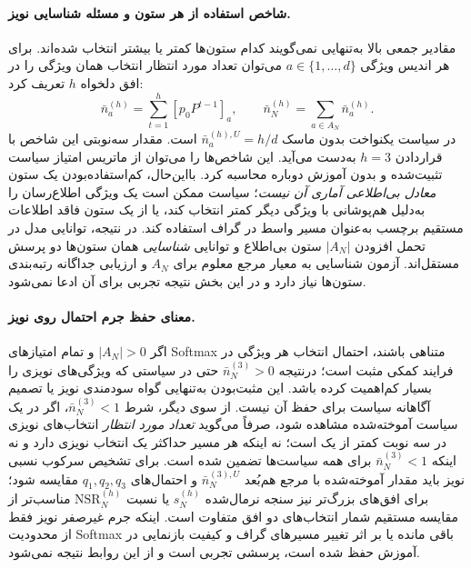 \paragraph{شاخص استفاده از هر ستون و مسئله شناسایی نویز.}
مقادیر جمعی بالا به‌تنهایی نمی‌گویند
کدام ستون‌ها کمتر یا بیشتر انتخاب شده‌اند.
برای هر اندیس ویژگی $a\in\{1,\ldots,d\}$
می‌توان تعداد مورد انتظار انتخاب همان ویژگی
را در افق دلخواه $h$ تعریف کرد:
\begin{equation}\label{eq:ch3-noise-per-feature-selection}
\boxed{
\bar n_a^{(h)}
=\sum_{t=1}^{h}[p_0P^{t-1}]_a,\qquad
\bar n_N^{(h)}=\sum_{a\in A_N}\bar n_a^{(h)}.
}
\end{equation}
در سیاست یکنواخت بدون ماسک
$\bar n_a^{(h),U}=h/d$ است.
مقدار سه‌نوبتی این شاخص با قراردادن $h=3$
به‌دست می‌آید.
این شاخص‌ها را می‌توان از ماتریس امتیاز
سیاست تثبیت‌شده و بدون آموزش دوباره محاسبه کرد.
بااین‌حال، کم‌استفاده‌بودن یک ستون
\emph{معادل بی‌اطلاعی آماری آن نیست}؛
سیاست ممکن است یک ویژگی اطلاع‌رسان را
به‌دلیل هم‌پوشانی با ویژگی دیگر کمتر انتخاب کند،
یا از یک ستون فاقد اطلاعات مستقیم برچسب
به‌عنوان مسیر واسط در گراف استفاده کند.
در نتیجه، توانایی مدل در تحمل افزودن
$|A_N|$ ستون بی‌اطلاع و توانایی
\emph{شناسایی} همان ستون‌ها دو پرسش
مستقل‌اند. آزمون شناسایی به معیار مرجع
معلوم برای $A_N$ و ارزیابی جداگانه
رتبه‌بندی ستون‌ها نیاز دارد و
در این بخش نتیجه تجربی برای آن ادعا نمی‌شود.

\paragraph{معنای حفظ جرم احتمال روی نویز.}
اگر $|A_N|>0$ و تمام امتیازهای Softmax متناهی باشند،
احتمال انتخاب هر ویژگی در فرایند کمکی مثبت است؛
درنتیجه $\bar n_N^{(3)}>0$ حتی در سیاستی که
ویژگی‌های نویزی را بسیار کم‌اهمیت کرده باشد.
این مثبت‌بودن به‌تنهایی گواه سودمندی نویز
یا تصمیم آگاهانه سیاست برای حفظ آن نیست.
از سوی دیگر، شرط $\bar n_N^{(3)}<1$، اگر در یک سیاست
آموخته‌شده مشاهده شود، صرفاً می‌گوید
\emph{تعداد مورد انتظار} انتخاب‌های نویزی
در سه نوبت کمتر از یک است؛
نه اینکه هر مسیر حداکثر یک انتخاب نویزی دارد
و نه اینکه $\bar n_N^{(3)}<1$ برای همه سیاست‌ها تضمین شده است.
برای تشخیص سرکوب نسبی نویز باید مقدار آموخته‌شده
با مرجع هم‌بُعد $\bar n_N^{(3),U}$ و احتمال‌های
$q_1,q_2,q_3$ مقایسه شود؛ برای افق‌های
بزرگ‌تر نیز سنجه نرمال‌شده
$s_N^{(h)}$ یا نسبت
$\mathrm{NSR}_N^{(h)}$
مناسب‌تر از مقایسه مستقیم
شمار انتخاب‌های دو افق متفاوت است.
اینکه جرم غیرصفر نویز فقط از محدودیت Softmax
باقی مانده یا بر اثر تغییر مسیرهای گراف
و کیفیت بازنمایی در آموزش حفظ شده است،
پرسشی تجربی است و از این روابط نتیجه نمی‌شود.

